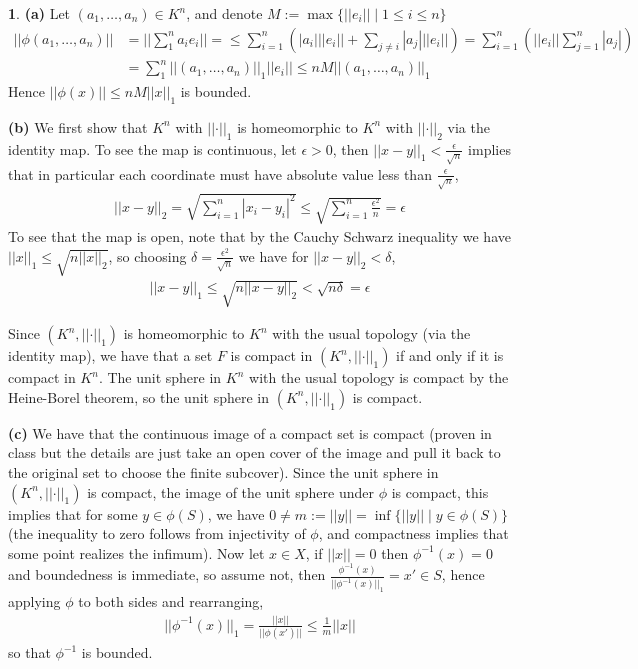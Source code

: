 \documentclass[10.5pt]{article}
\theoremstyle{definition}
\newtheorem{pb}{}
\newcommand{\set}[1]{\{#1\}}
\newcommand{\abs}[1]{\left\vert#1\right\vert}
\newcommand{\norm}[1]{\lvert\lvert#1\rvert\rvert}
\begin{document}
    \begin{pb}
        \textbf{(a)} Let \((a_1,\hdots,a_n) \in K^n\), and denote \(M := \max\set{\norm{e_i} \mid 1 \leq i \leq n}\)
        \begin{align*}
            \norm{\phi(a_1,\hdots,a_n)} &= \norm{\sum_1^n a_i e_i} = \leq \sum_{i=1}^n \left(\abs{a_i}\norm{e_i} + \sum_{j\neq i}\abs{a_j}\norm{e_i}\right)
            = \sum_{i=1}^n \left(\norm{e_i}\sum_{j=1}^n \abs{a_j}\right)\\ 
            &= \sum_1^n \norm{(a_1,\hdots,a_n)}_1\norm{e_i} \leq nM\norm{(a_1,\hdots,a_n)}_1
        \end{align*}
        Hence \(\norm{\phi(x)} \leq nM\norm{x}_1\) is bounded.

        \textbf{(b)} We first show that \(K^n\) with \(\norm{\cdot}_1\) is homeomorphic to \(K^n\) with \(\norm{\cdot}_2\) via the identity map. To see the map is continuous, let \(\epsilon > 0\), then \(\norm{x-y}_1 < \frac{\epsilon}{\sqrt{n}}\) implies that in particular each coordinate must have absolute value less than \(\frac{\epsilon}{\sqrt{n}}\),
        \begin{align*}
            \norm{x-y}_2 = \sqrt{\sum_{i=1}^n \abs{x_i - y_i}^2} \leq \sqrt{\sum_{i=1}^n \frac{\epsilon^2}{n}} = \epsilon
        \end{align*}
        To see that the map is open, note that by the Cauchy Schwarz inequality we have \(\norm{x}_1 \leq \sqrt{n\norm{x}_2}\), so choosing \(\delta = \frac{\epsilon^2}{\sqrt{n}}\) we have for \(\norm{x-y}_2 < \delta\),
        \begin{align*}
            \norm{x-y}_1 \leq \sqrt{n\norm{x-y}_2} < \sqrt{n\delta} = \epsilon
        \end{align*}

        Since \((K^n,\norm{\cdot}_1)\) is homeomorphic to \(K^n\) with the usual topology (via the identity map), we have that a set \(F\) is compact in \((K^n,\norm{\cdot}_1)\) if and only if it is compact in \(K^n\). The unit sphere in \(K^n\) with the usual topology is compact by the Heine-Borel theorem, so the unit sphere in \((K^n,\norm{\cdot}_1)\) is compact.

        \textbf{(c)} We have that the continuous image of a compact set is compact (proven in class but the details are just take an open cover of the image and pull it back to the original set to choose the finite subcover). Since the unit sphere in \((K^n,\norm{\cdot}_1)\) is compact, the image of the unit sphere under \(\phi\) is compact, this implies that for some \(y \in \phi(S)\), we have \(0 \neq m := \norm{y} = \inf\set{\norm{y} \mid y \in \phi(S)}\) (the inequality to zero follows from injectivity of \(\phi\), and compactness implies that some point realizes the infimum). Now let \(x \in X\), if \(\norm{x} = 0\) then \(\phi^{-1}(x) = 0\) and boundedness is immediate, so assume not, then \(\frac{\phi^{-1}(x)}{\norm{\phi^{-1}(x)}_1} = x' \in S\), hence applying \(\phi\) to both sides and rearranging,
        \begin{align*}
            \norm{\phi^{-1}(x)}_1 = \frac{\norm{x}}{\norm{\phi(x')}} \leq \frac{1}{m}\norm{x}
        \end{align*}
        so that \(\phi^{-1}\) is bounded.


\end{pb}
\end{document}
